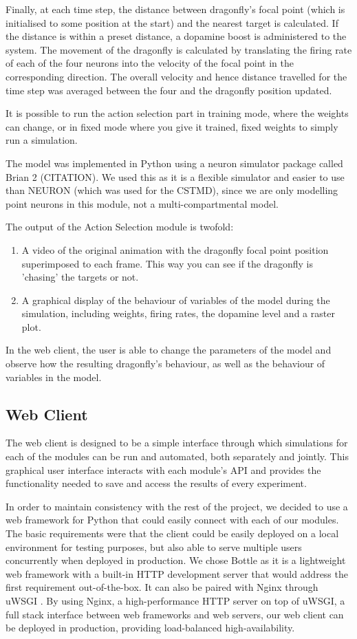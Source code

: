 \documentclass[a4paper,11pt]{article}
\begin{document}
Finally, at each time step, the distance between dragonfly's focal point (which is initialised to some position at the start) and the nearest target is calculated. If the distance is within a preset distance, a dopamine boost is administered to the system. The movement of the dragonfly is calculated by translating the firing rate of each of the four neurons into the velocity of the focal point in the corresponding direction. The overall velocity and hence distance travelled for the time step was averaged between the four and the dragonfly position updated. 

It is possible to run the action selection part in training mode, where the weights can change, or in fixed mode where you give it trained, fixed weights to simply run a simulation. 

The model was implemented in Python using a neuron simulator package called Brian 2 (CITATION). We used this as it is a flexible simulator and easier to use than NEURON (which was used for the CSTMD), since we are only modelling point neurons in this module, not a multi-compartmental model. 

The output of the Action Selection module is twofold:
\begin{enumerate}
\item A video of the original animation with the dragonfly focal point position superimposed to each frame. This way you can see if the dragonfly is 'chasing' the targets or not.
\item A graphical display of the behaviour of variables of the model during the simulation, including weights, firing rates, the dopamine level and a raster plot.
\end{enumerate}
In the web client, the user is able to change the parameters of the model and observe how the resulting dragonfly's behaviour, as well as the behaviour of variables in the model.

\subsection{Web Client}
The web client is designed to be a simple interface through which simulations for each of the modules can be run and automated, both separately and jointly. This graphical user interface interacts with each module's API and provides the functionality needed to save and access the results of every experiment.

In order to maintain consistency with the rest of the project, we decided to use a web framework for Python that could easily connect with each of our modules. The basic requirements were that the client could be easily deployed on a local environment for testing purposes, but also able to serve multiple users concurrently when deployed in production. We chose Bottle \cite{bottle} as it is a lightweight web framework with a built-in HTTP development server that would address the first requirement out-of-the-box. It can also be paired with Nginx \cite{nginx} through uWSGI \cite{uwsgi}. By using Nginx, a high-performance HTTP server on top of uWSGI, a full stack interface between web frameworks and web servers, our web client can be deployed in production, providing load-balanced high-availability.
\end{document}
